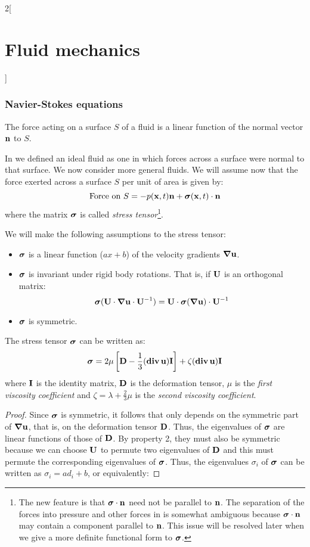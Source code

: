 \documentclass[../../../main_physics.tex]{subfiles}
\begin{document}
\begin{multicols}{2}[\section{Fluid mechanics}]
  \subsubsection{Navier-Stokes equations}
  \begin{theorem} 
    The force acting on a surface $S$ of a fluid is a linear function of the normal vector $\boldsymbol{\mathrm{n}}$ to $S$.
  \end{theorem}
  In  we defined an ideal fluid as one in which forces across a surface were normal to that surface. We now consider more general fluids. We will assume now that the force exerted across a surface $S$ per unit of area is given by:
  $$
    \text{Force on $S$}=-p(\boldsymbol{\mathrm{x}},t)\boldsymbol{\mathrm{n}}+\boldsymbol{\mathrm{\sigma}}(\boldsymbol{\mathrm{x}},t)\cdot\boldsymbol{\mathrm{n}}
  $$
  where the matrix $\boldsymbol{\mathrm{\sigma}}$ is called \emph{stress tensor}\footnote{The new feature is that $\boldsymbol{\mathrm{\sigma}}\cdot\boldsymbol{\mathrm{n}}$ need not be parallel to $\boldsymbol{\mathrm{n}}$. The separation of the forces into pressure and other forces in is somewhat ambiguous because $\boldsymbol{\mathrm{\sigma}}\cdot\boldsymbol{\mathrm{n}}$ may contain a component parallel to $\boldsymbol{\mathrm{n}}$. This issue will be resolved later when we give a more definite functional form to $\boldsymbol{\mathrm{\sigma}}$.}.
  \begin{remark}
    We will make the following assumptions to the stress tensor:
    \begin{itemize}
      \item $\boldsymbol{\mathrm{\sigma}}$ is a linear function ($ax+b$) of the velocity gradients $\grad \boldsymbol{\mathrm{u}}$.
      \item $\boldsymbol{\mathrm{\sigma}}$ is invariant under rigid body rotations. That is, if $\boldsymbol{\mathrm{U}}$ is an orthogonal matrix:
            $$
              \boldsymbol{\mathrm{\sigma}}(\boldsymbol{\mathrm{U}}\cdot\grad \boldsymbol{\mathrm{u}}\cdot\boldsymbol{\mathrm{U}}^{-1})=\boldsymbol{\mathrm{U}}\cdot\boldsymbol{\mathrm{\sigma}}(\grad \boldsymbol{\mathrm{u}})\cdot\boldsymbol{\mathrm{U}}^{-1}
            $$
      \item $\boldsymbol{\mathrm{\sigma}}$ is symmetric.
    \end{itemize}
  \end{remark}
  \begin{proposition}
    The stress tensor $\boldsymbol{\mathrm{\sigma}}$ can be written as:
    $$
      \boldsymbol{\mathrm{\sigma}}=2\mu\left[\boldsymbol{\mathrm{D}} -\frac{1}{3}(\operatorname{\boldsymbol{\mathrm{div}}}\boldsymbol{\mathrm{u}}) \boldsymbol{\mathrm{I}}\right]+\zeta(\operatorname{\boldsymbol{\mathrm{div}}}\boldsymbol{\mathrm{u}}) \boldsymbol{\mathrm{I}}
    $$
    where $\boldsymbol{\mathrm{I}}$ is the identity matrix, $\boldsymbol{\mathrm{D}}$ is the deformation tensor, $\mu$ is the \emph{first viscosity coefficient} and $\zeta=\lambda+\frac{2}{3}\mu$ is the \emph{second viscosity coefficient}.
  \end{proposition}
  \begin{proof}
    Since $\boldsymbol{\mathrm{\sigma}}$ is symmetric, it follows that only depends on the symmetric part of $\grad \boldsymbol{\mathrm{u}}$, that is, on the deformation tensor $\boldsymbol{\mathrm{D}}$. Thus, the eigenvalues of $\boldsymbol{\mathrm{\sigma}}$ are linear functions of those of $\boldsymbol{\mathrm{D}}$. By property 2, they must also be symmetric because we can choose $\boldsymbol{\mathrm{U}}$ to permute two eigenvalues of $\boldsymbol{\mathrm{D}}$ and this must permute the corresponding eigenvalues of $\boldsymbol{\mathrm{\sigma}}$. Thus, the eigenvalues $\sigma_i$ of $\boldsymbol{\mathrm{\sigma}}$ can be written as $\sigma_i=a d_i + b$, or equivalently:

\end{proof}
\end{multicols}
\end{document}
